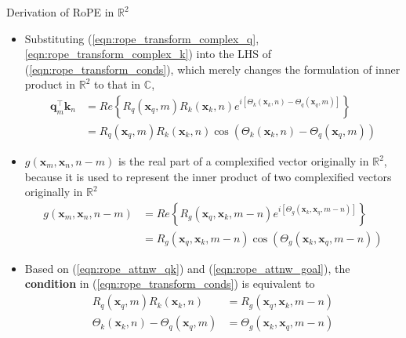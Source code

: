 \documentclass{beamer}
\newcommand{\transpose}{^{\top}}
\begin{document}
	\begin{frame}{Derivation of RoPE in $\mathbb{R}^2$}	
		\begin{itemize}		
			\item Substituting (\ref{eqn:rope_transform_complex_q},\ref{eqn:rope_transform_complex_k}) into the LHS of  (\ref{eqn:rope_transform_conds}), which merely changes the formulation of inner product in $\mathbb{R}^2$ to that in $\mathbb{C}$,
			\begin{equation}\label{eqn:rope_attnw_qk}
				\begin{split}
					\mathbf{q}_m\transpose \mathbf{k}_n &= Re\left\{R_q(\mathbf{x}_q, m)R_k(\mathbf{x}_k, n)e^{i\left[\Theta_k(\mathbf{x}_k, n) -\Theta_q(\mathbf{x}_q, m)\right]}\right\} \\
					&= R_q(\mathbf{x}_q, m)R_k(\mathbf{x}_k, n)\cos\left(\Theta_k(\mathbf{x}_k, n) -\Theta_q(\mathbf{x}_q, m)\right)
				\end{split}
			\end{equation}
			\item $g(\mathbf{x}_m, \mathbf{x}_n, n-m)$ is the real part of a complexified vector originally in $\mathbb{R}^2$, because it is used to represent the inner product of two complexified vectors originally in $\mathbb{R}^2$
			\begin{equation}\label{eqn:rope_attnw_goal}
				\begin{split}
					g(\mathbf{x}_m, \mathbf{x}_n, n-m) &= Re\left\{R_g(\mathbf{x}_q, \mathbf{x}_k, m-n)e^{i\left[\Theta_g(\mathbf{x}_k, \mathbf{x}_q, m-n)\right]}\right\} \\
					&= R_g(\mathbf{x}_q, \mathbf{x}_k, m-n)\cos\left(\Theta_g(\mathbf{x}_k, \mathbf{x}_q, m-n)\right)
				\end{split}
			\end{equation}
			\item Based on (\ref{eqn:rope_attnw_qk}) and (\ref{eqn:rope_attnw_goal}), the \textbf{condition} in (\ref{eqn:rope_transform_conds}) is equivalent to 
			\begin{align}				
				R_q(\mathbf{x}_q, m)R_k(\mathbf{x}_k, n) &= R_g(\mathbf{x}_q, \mathbf{x}_k, m-n) \label{eqn:rope_transform_conds_amplitude}\\
				\Theta_k(\mathbf{x}_k, n) -\Theta_q(\mathbf{x}_q, m) &= \Theta_g(\mathbf{x}_k, \mathbf{x}_q, m-n) \label{eqn:rope_transform_conds_angular}				
			\end{align}
		\end{itemize}
	\end{frame}
	
\end{document}
